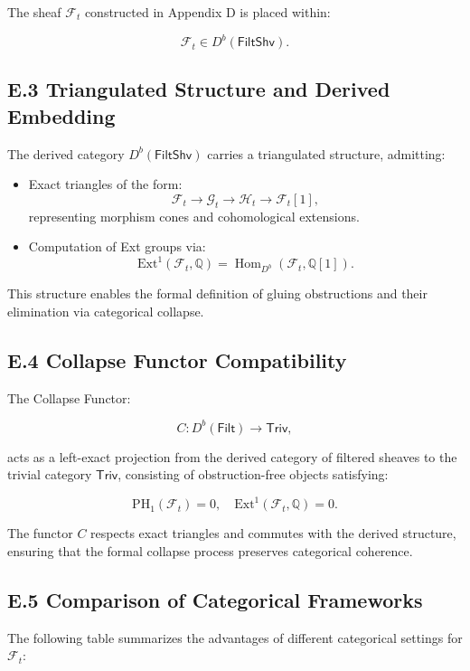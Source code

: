 \documentclass[11pt]{article}
\begin{document}
The sheaf \( \mathcal{F}_t \) constructed in Appendix D is placed within:

\[
\mathcal{F}_t \in D^b(\mathsf{FiltShv}).
\]

\subsection*{E.3 Triangulated Structure and Derived Embedding}

The derived category \( D^b(\mathsf{FiltShv}) \) carries a triangulated structure, admitting:

\begin{itemize}
  \item Exact triangles of the form:
  \[
  \mathcal{F}_t \to \mathcal{G}_t \to \mathcal{H}_t \to \mathcal{F}_t[1],
  \]
  representing morphism cones and cohomological extensions.
  \item Computation of Ext groups via:
  \[
  \mathrm{Ext}^1(\mathcal{F}_t, \mathbb{Q}) = \operatorname{Hom}_{D^b}(\mathcal{F}_t, \mathbb{Q}[1]).
  \]
\end{itemize}

This structure enables the formal definition of gluing obstructions and their elimination via categorical collapse.

\subsection*{E.4 Collapse Functor Compatibility}

The Collapse Functor:

\[
C : D^b(\mathsf{Filt}) \to \mathsf{Triv},
\]

acts as a left-exact projection from the derived category of filtered sheaves to the trivial category \( \mathsf{Triv} \), consisting of obstruction-free objects satisfying:

\[
\mathrm{PH}_1(\mathcal{F}_t) = 0, \quad \mathrm{Ext}^1(\mathcal{F}_t, \mathbb{Q}) = 0.
\]

The functor \( C \) respects exact triangles and commutes with the derived structure, ensuring that the formal collapse process preserves categorical coherence.

\subsection*{E.5 Comparison of Categorical Frameworks}

The following table summarizes the advantages of different categorical settings for \( \mathcal{F}_t \):
\end{document}
